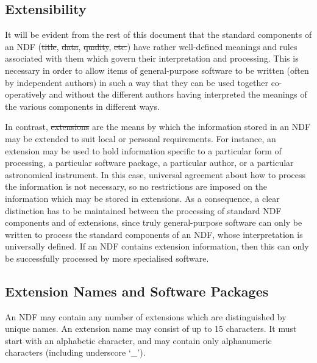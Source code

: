 \subsection{Extensibility}

It will be evident from the rest of this document that the standard components
of an NDF (\st{title}, \st{data}, \st{quality}, \st{etc.}) have rather
well-defined meanings and rules associated with them which govern their
interpretation and processing. 
This is necessary in order to allow items of general-purpose software to be
written (often by independent authors) in such a way that they can be used
together co-operatively and without the different authors having interpreted
the meanings of the various components in different ways. 

In contrast, \st{extensions\/} are the means by which the information stored
in an NDF may be extended to suit local or personal requirements.
For instance, an extension may be used to hold information specific to a
particular form of processing, a particular software package, a particular
author, or a particular astronomical instrument. 
In this case, universal agreement about how to process the information is
not necessary, so no restrictions are imposed on the information which may
be stored in extensions. 
As a consequence, a clear distinction has to be maintained between the
processing of standard NDF components and of extensions, since truly
general-purpose software can only be written to process the standard
components of an NDF, whose interpretation is universally defined. 
If an NDF contains extension information, then this can only be successfully
processed by more specialised software. 

\subsection{Extension Names and Software Packages}

An NDF may contain any number of extensions which are distinguished
by unique names.
An extension name may consist of up to 15 characters.
It must start with an alphabetic character, and may contain only
alphanumeric characters (including underscore `\_'). 

